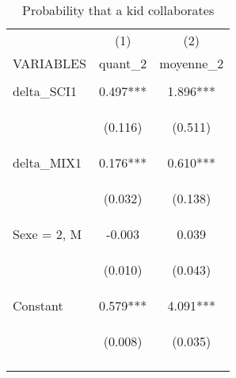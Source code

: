 \documentclass{article} %
\begin{document}
\begin{table}[H]
\caption{Probability that a kid collaborates} \label{tab:behav_results}


\begin{center}
\begin{tabular}{lcc} \hline
 & (1) & (2) \\
VARIABLES & quant\_2 & moyenne\_2 \\ \hline
\vspace{4pt} & \begin{footnotesize}\end{footnotesize} & \begin{footnotesize}\end{footnotesize} \\
delta\_SCI1 & 0.497*** & 1.896*** \\
\vspace{4pt} & \begin{footnotesize}(0.116)\end{footnotesize} & \begin{footnotesize}(0.511)\end{footnotesize} \\
delta\_MIX1 & 0.176*** & 0.610*** \\
\vspace{4pt} & \begin{footnotesize}(0.032)\end{footnotesize} & \begin{footnotesize}(0.138)\end{footnotesize} \\
Sexe = 2, M & -0.003 & 0.039 \\
\vspace{4pt} & \begin{footnotesize}(0.010)\end{footnotesize} & \begin{footnotesize}(0.043)\end{footnotesize} \\
Constant & 0.579*** & 4.091*** \\
 & \begin{footnotesize}(0.008)\end{footnotesize} & \begin{footnotesize}(0.035)\end{footnotesize} \\
\vspace{4pt} & \begin{footnotesize}\end{footnotesize} & \begin{footnotesize}\end{footnotesize} \\

\end{tabular}
\end{center}
\end{table}
\end{document}
